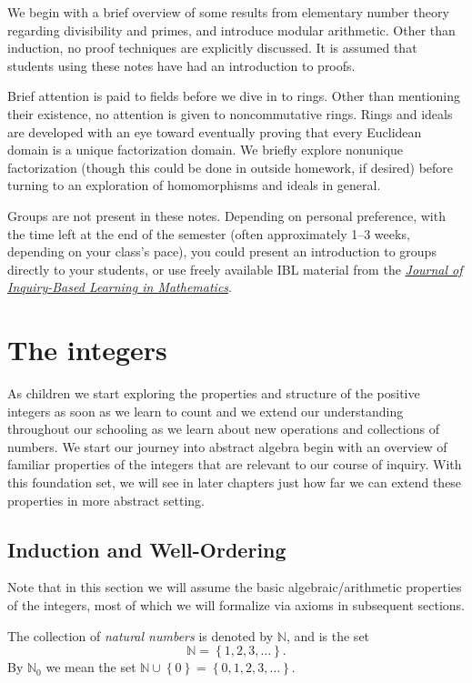 \documentclass[english,course]{lecture}
\theoremstyle{plain}
\newenvironment{definition}[1]
  {\renewcommand\theinnerdefinition{#1}\innerdefinition}
  {\endinnerdefinition}
\def\set#1{\left\{ {#1} \right\}}
\def\N{{\mathbb N}}
\begin{document}
We begin with a brief overview of some results from elementary number theory regarding divisibility and primes, and introduce modular arithmetic. Other than induction, no proof techniques are explicitly discussed. It is assumed that students using these notes have had an introduction to proofs.

Brief attention is paid to fields before we dive in to rings. Other than mentioning their existence, no attention is given to noncommutative rings. Rings and ideals are developed with an eye toward eventually proving that every Euclidean domain is a unique factorization domain. We briefly explore nonunique factorization (though this could be done in outside homework, if desired) before turning to an exploration of homomorphisms and ideals in general.

Groups are not present in these notes. Depending on personal preference, with the time left at the end of the semester (often approximately 1--3 weeks, depending on your class's pace), you could present an introduction to groups directly to your students, or use freely available IBL material from the \href{http://jiblm.org/}{\emph{Journal of Inquiry-Based Learning in Mathematics}}.


\clearpage

\section{The integers}\label{Sec-Integers}


As children we start exploring the properties and structure of the positive integers as soon as we learn to count and we extend our understanding throughout our schooling as we learn about new operations and collections of numbers. We start our journey into abstract algebra begin with an overview of familiar properties of the integers that are relevant to our course of inquiry. With this foundation set, we will see in later chapters just how far we can extend these properties in more abstract setting.


\subsection{Induction and Well-Ordering}\label{SubSec-WellOrdering}

Note that in this section we will assume the basic algebraic/arithmetic properties of the integers, most of which we will formalize via axioms in subsequent sections.

\begin{definition}\label{def:naturalnumbers}\index{$\N$}
	The collection of \emph{natural numbers} is denoted by $\N$, and is the set
	\[
		\N = \set{1, 2, 3, \ldots}.
	\]
	By $\N_0$ we mean the set $\N\cup \set{0} = \set{0, 1, 2, 3, \ldots}$.
\end{definition}
\end{document}
